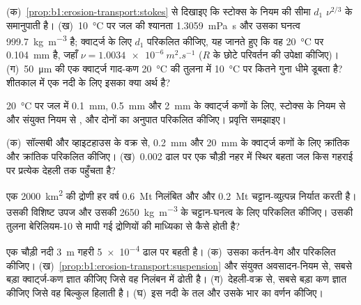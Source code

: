 \begin{exercise}[$\star\star$]
\label{exo:b1:erosion-transport:6}
(क)~\cref{prop:b1:erosion-transport:stokes} से दिखाइए कि स्टोक्स के नियम की सीमा $d_1$ $\nu^{2/3}$ के समानुपाती है। (ख)~\qty{10}{\celsius} पर जल की श्यानता \qty{1.3059}{mPa.s} और उसका घनत्व \qty{999.7}{kg.m^{-3}} है; क्वार्ट्ज के लिए $d_1$ परिकलित कीजिए, यह जानते हुए कि वह \qty{20}{\celsius} पर \qty{0.104}{mm} है, जहाँ $\nu = \qty{1.0034e-6}{m^2.s^{-1}}$ ($R$ के छोटे परिवर्तन की उपेक्षा कीजिए)। (ग)~\qty{50}{\micro m} की एक क्वार्ट्ज गाद-कण \qty{20}{\celsius} की तुलना में \qty{10}{\celsius} पर कितने गुना धीमे डूबता है? शीतकाल में एक नदी के लिए इसका क्या अर्थ है?
\end{exercise}

\begin{exercise}[$\star\star$]
\label{exo:b1:erosion-transport:7}
\qty{20}{\celsius} पर जल में \qty{0.1}{mm}, \qty{0.5}{mm} और \qty{2}{mm} के क्वार्ट्ज कणों के लिए, स्टोक्स के नियम से और संयुक्त नियम से , और दोनों का अनुपात परिकलित कीजिए। प्रवृत्ति समझाइए।
\end{exercise}

\begin{exercise}[$\star\star$]
\label{exo:b1:erosion-transport:8}
(क)~सॉल्सबी और व्हाइटहाउस के वक्र से, \qty{0.2}{mm} और \qty{20}{mm} के क्वार्ट्ज कणों के लिए क्रांतिक  और क्रांतिक  परिकलित कीजिए। (ख)~\num{0.002} ढाल पर एक चौड़ी नहर में स्थिर बहता जल किस गहराई पर प्रत्येक देहली तक पहुँचता है?
\end{exercise}

\begin{exercise}[$\star\star$]
\label{exo:b1:erosion-transport:9}
एक \qty{2000}{km^2} की द्रोणी हर वर्ष \qty{0.6}{Mt} निलंबित और  और \qty{0.2}{Mt} चट्टान-व्युत्पन्न  निर्यात करती है। उसकी विशिष्ट उपज और उसकी  \qty{2650}{kg.m^{-3}} के चट्टान-घनत्व के लिए परिकलित कीजिए। उसकी तुलना बेरिलियम-10 से मापी गई द्रोणियों की माध्यिका से कैसे होती है?
\end{exercise}

\begin{exercise}[$\star\star\star$]
\label{exo:b1:erosion-transport:10}
एक चौड़ी नदी \qty{3}{m} गहरी \num{5e-4} ढाल पर बहती है। (क)~उसका कर्तन-वेग और  परिकलित कीजिए। (ख)~\cref{prop:b1:erosion-transport:suspension} और संयुक्त अवसादन-नियम से, सबसे बड़ा क्वार्ट्ज-कण ज्ञात कीजिए जिसे वह निलंबन में ढोती है। (ग)~देहली-वक्र से, सबसे बड़ा कण ज्ञात कीजिए जिसे वह बिल्कुल हिलाती है। (घ)~इस नदी के तल और उसके भार का वर्णन कीजिए।
\end{exercise}

